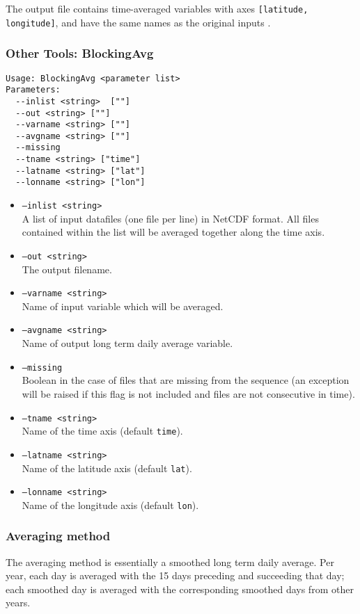 \documentclass{article}
\begin{document}
The output file contains time-averaged variables  with axes \texttt{[latitude, longitude]}, and have the same names as the original inputs . 



\subsubsection{Other Tools: BlockingAvg}\label{bavg}
\begin{verbatim}
Usage: BlockingAvg <parameter list>
Parameters:
  --inlist <string>  [""]
  --out <string> [""]
  --varname <string> [""]
  --avgname <string> [""]
  --missing
  --tname <string> ["time"]
  --latname <string> ["lat"]
  --lonname <string> ["lon"]
\end{verbatim}

\begin{itemize}
\item[]\texttt{--inlist <string>} \\ A list of input datafiles (one file per line) in NetCDF format. All files contained within the list will be averaged together along the time axis.
\item[] \texttt{--out <string>}\\ The output filename.
\item[] \texttt{--varname <string>}\\ Name of input variable which will be averaged.
\item[]\texttt{--avgname <string>}\\Name of output long term daily average variable.
\item[]\texttt{--missing}\\ Boolean in the case of files that are missing from the sequence (an exception will be raised if this flag is not included and files are not consecutive in time).
\item[] \texttt{--tname <string>}\\Name of the time axis (default \texttt{time}).
\item[]\texttt{--latname <string>}\\Name of the latitude axis (default \texttt{lat}).
\item[]\texttt{--lonname <string>}\\Name of the longitude axis (default \texttt{lon}).
\end{itemize}

\subsubsection{Averaging method}
The averaging method is essentially a smoothed long term daily average. Per year, each day is averaged with the 15 days preceding and succeeding that day; each smoothed day is averaged with the corresponding smoothed days from other years. 
\end{document}

